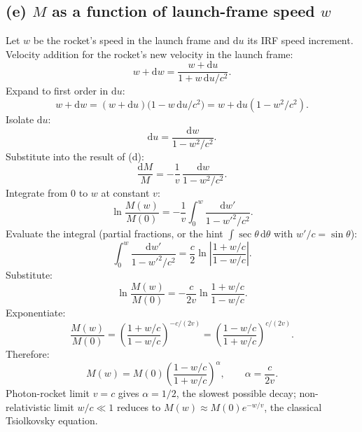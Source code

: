 \documentclass[11pt]{article}
\newcommand{\de}{\mathrm{d}}
\begin{document}
\subsection*{(e) $M$ as a function of launch-frame speed $w$}

Let $w$ be the rocket's speed in the launch frame and $\de u$ its IRF speed increment. Velocity addition for the rocket's new velocity in the launch frame:
\[ w+\de w=\frac{w+\de u}{1+w\,\de u/c^{2}}. \]
Expand to first order in $\de u$:
\[ w+\de w=(w+\de u)\big(1-w\,\de u/c^{2}\big)=w+\de u(1-w^{2}/c^{2}). \]
Isolate $\de u$:
\[ \de u=\frac{\de w}{1-w^{2}/c^{2}}. \]
Substitute into the result of (d):
\[ \frac{\de M}{M}=-\frac{1}{v}\,\frac{\de w}{1-w^{2}/c^{2}}. \]
Integrate from $0$ to $w$ at constant $v$:
\[ \ln\frac{M(w)}{M(0)}=-\frac{1}{v}\int_{0}^{w}\frac{\de w'}{1-w'^{2}/c^{2}}. \]
Evaluate the integral (partial fractions, or the hint $\int\sec\theta\,\de\theta$ with $w'/c=\sin\theta$):
\[ \int_{0}^{w}\frac{\de w'}{1-w'^{2}/c^{2}}=\frac{c}{2}\ln\!\left|\frac{1+w/c}{1-w/c}\right|. \]
Substitute:
\[ \ln\frac{M(w)}{M(0)}=-\frac{c}{2v}\ln\frac{1+w/c}{1-w/c}. \]
Exponentiate:
\[ \frac{M(w)}{M(0)}=\left(\frac{1+w/c}{1-w/c}\right)^{-c/(2v)}=\left(\frac{1-w/c}{1+w/c}\right)^{c/(2v)}. \]
Therefore:
\begin{equation}
\boxed{\;M(w)=M(0)\left(\frac{1-w/c}{1+w/c}\right)^{\alpha},\qquad \alpha=\frac{c}{2v}.\;}
\end{equation}
Photon-rocket limit $v=c$ gives $\alpha=1/2$, the slowest possible decay; non-relativistic limit $w/c\ll 1$ reduces to $M(w)\approx M(0)e^{-w/v}$, the classical Tsiolkovsky equation.
\end{document}
